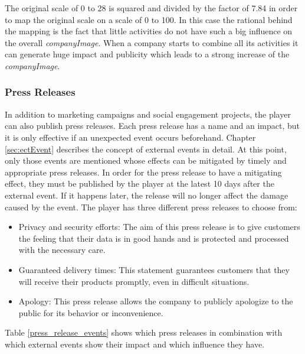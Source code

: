 The original scale of 0 to 28 is squared and divided by the factor of 7.84 in order to map the original scale on a scale of 0 to 100. In this case the rational behind the mapping is the fact that little activities do not have such  a big influence on the overall \textit{companyImage}. When a company starts to combine all its activities it can generate huge impact and publicity which leads to a strong increase of the \textit{companyImage}.


\subsubsection{Press Releases} \label{press_releases}

In addition to marketing campaigns and social engagement projects, the player can also publish press releases. Each press release has a name and an impact, but it is only effective if an unexpected event occurs beforehand. Chapter \ref{sec:ectEvent} describes the concept of external events in detail. At this point, only those events are mentioned whose effects can be mitigated by timely and appropriate press releases.
In order for the press release to have a mitigating effect, they must be published by the player at the latest 10 days after the external event. If it happens later, the release will no longer affect the damage caused by the event. The player has three different press releases to choose from: 
\begin{itemize}
    \item Privacy and security efforts: The aim of this press release is to give customers the feeling that their data is in good hands and is protected and processed with the necessary care.  
    \item Guaranteed delivery times: This statement guarantees customers that they will receive their products promptly, even in difficult situations. 
    \item Apology: This press release allows the company to publicly apologize to the public for its behavior or inconvenience.
\end{itemize}

Table \ref{press_release_events} shows which press releases in combination with which external events show their impact and which influence they have.


